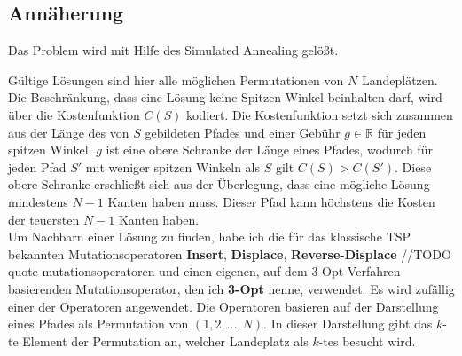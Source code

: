 \documentclass[a4paper,10pt,ngerman]{scrartcl}
\begin{document}
\subsection{Annäherung}
Das Problem wird mit Hilfe des Simulated Annealing gelößt.
\begin{algorithmic}
  \EndIf
  \EndIf
  \EndFor

  \EndProcedure
\end{algorithmic}
Gültige Lösungen sind hier alle möglichen Permutationen von $N$ Landeplätzen. Die Beschränkung, dass eine
Lösung keine Spitzen Winkel beinhalten darf, wird über die Kostenfunktion $C(S)$ kodiert. Die Kostenfunktion
setzt sich zusammen aus der Länge des von $S$ gebildeten Pfades und einer Gebühr $g \in \mathbb{R}$ für jeden spitzen Winkel. $g$
ist eine obere Schranke der Länge eines Pfades, wodurch für jeden Pfad $S'$ mit weniger spitzen Winkeln als $S$
gilt $C(S) > C(S')$. Diese obere Schranke erschließt sich aus der Überlegung, dass eine mögliche Lösung mindestens $N-1$ Kanten haben muss.
Dieser Pfad kann höchstens die Kosten der teuersten $N-1$ Kanten haben. \\
Um Nachbarn einer Lösung zu finden, habe ich die für das klassische TSP bekannten Mutationsoperatoren \textbf{Insert}, \textbf{Displace}, \textbf{Reverse-Displace}
//TODO quote mutationsoperatoren
und einen eigenen, auf dem 3-Opt-Verfahren basierenden Mutationsoperator, den ich \textbf{3-Opt} nenne, verwendet. Es wird zufällig einer der Operatoren angewendet.
Die Operatoren basieren auf der
Darstellung eines Pfades als Permutation von $(1, 2, \ldots, N)$. In dieser Darstellung gibt das $k$-te Element der Permutation
an, welcher Landeplatz als $k$-tes besucht wird.
\end{document}

